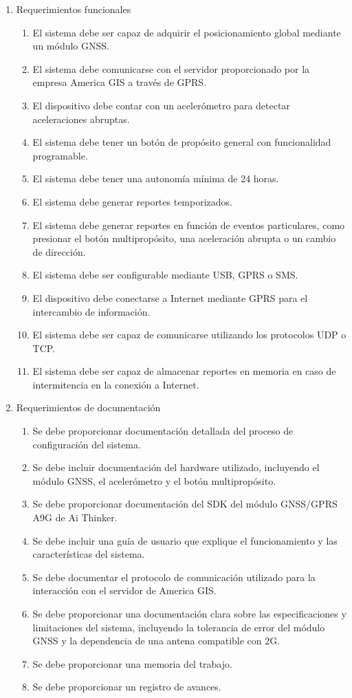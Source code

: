 \documentclass[
11pt, %
codirector, %
]{charter}
\begin{document}
\begin{enumerate}
\item Requerimientos funcionales
    \begin{enumerate}
    \item El sistema debe ser capaz de adquirir el posicionamiento global mediante un módulo GNSS.
    \item El sistema debe comunicarse con el servidor proporcionado por la empresa America GIS a través de GPRS.
    \item El dispositivo debe contar con un acelerómetro para detectar aceleraciones abruptas.
    \item El sistema debe tener un botón de propósito general con funcionalidad programable.
    \item El sistema debe tener una autonomía mínima de 24 horas.
    \item El sistema debe generar reportes temporizados.
    \item El sistema debe generar reportes en función de eventos particulares, como presionar el botón multipropósito, una aceleración abrupta o un cambio de dirección.
    \item El sistema debe ser configurable mediante USB, GPRS o SMS.
    \item El dispositivo debe conectarse a Internet mediante GPRS para el intercambio de información.
    \item El sistema debe ser capaz de comunicarse utilizando los protocolos UDP o TCP.
    \item El sistema debe ser capaz de almacenar reportes en memoria en caso de intermitencia en la conexión a Internet.
    \end{enumerate}

\item Requerimientos de documentación
    \begin{enumerate}
    \item Se debe proporcionar documentación detallada del proceso de configuración del sistema.
    \item Se debe incluir documentación del hardware utilizado, incluyendo el módulo GNSS, el acelerómetro y el botón multipropósito.
    \item Se debe proporcionar documentación del SDK del módulo GNSS/GPRS A9G de Ai Thinker.
    \item Se debe incluir una guía de usuario que explique el funcionamiento y las características del sistema.
    \item Se debe documentar el protocolo de comunicación utilizado para la interacción con el servidor de America GIS.
    \item Se debe proporcionar una documentación clara sobre las especificaciones y limitaciones del sistema, incluyendo la tolerancia de error del módulo GNSS y la dependencia de una antena compatible con 2G.
    \item Se debe proporcionar una memoria del trabajo.
    \item Se debe proporcionar un registro de avances.
    \end{enumerate}
\end{enumerate}
\end{document}
